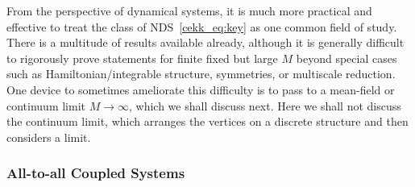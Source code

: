 \documentclass[10pt]{article}
\def\ra{\rightarrow}
\def\I{\infty}
\begin{document}
From the perspective of dynamical systems, it is much more practical and effective to treat the class of NDS~\eqref{cekk_eq:key} as one common field of study. There is a multitude of results available already, although it is generally difficult to rigorously prove statements for finite fixed but large $M$ beyond special cases such as Hamiltonian/integrable structure, symmetries, or multiscale reduction. One device to sometimes ameliorate this difficulty is to pass to a mean-field or continuum limit $M\ra \I$, which we shall discuss next. Here we shall not discuss the continuum limit, which arranges the vertices on a discrete structure and then considers a limit. 

\subsubsection*{All-to-all Coupled Systems}
\end{document}
